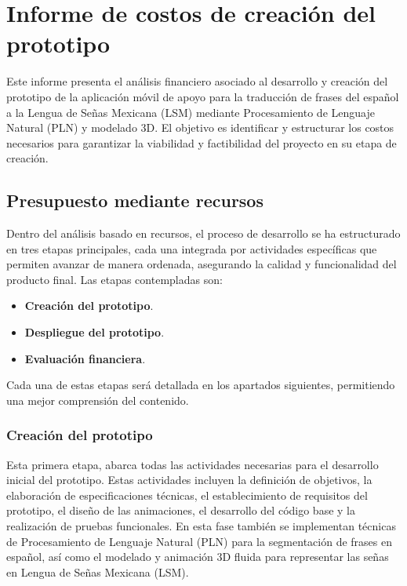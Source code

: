 \section{Informe de costos de creación del prototipo}
Este informe presenta el análisis financiero asociado al desarrollo y creación del prototipo de la aplicación móvil de apoyo para la traducción de frases del español a la Lengua de Señas Mexicana (LSM) mediante Procesamiento de Lenguaje Natural (PLN) y modelado 3D. El objetivo es identificar y estructurar los costos necesarios para garantizar la viabilidad y factibilidad del proyecto en su etapa de creación.

\subsection{Presupuesto mediante recursos}

Dentro del análisis basado en recursos, el proceso de desarrollo se ha estructurado en tres etapas principales, cada una integrada por actividades específicas que permiten avanzar de manera ordenada, asegurando la calidad y funcionalidad del producto final. Las etapas contempladas son:

\begin{itemize}
	\item \textbf{Creación del prototipo}. 
	\item \textbf{Despliegue del prototipo}.
	\item \textbf{Evaluación financiera}. 
\end{itemize}

Cada una de estas etapas será detallada en los apartados siguientes, permitiendo una mejor comprensión del contenido.

\subsubsection{Creación del prototipo}

Esta primera etapa, abarca todas las actividades necesarias para el desarrollo inicial del prototipo. Estas actividades incluyen la definición de objetivos, la elaboración de especificaciones técnicas, el establecimiento de requisitos del prototipo, el diseño de las animaciones, el desarrollo del código base y la realización de pruebas funcionales. En esta fase también se implementan técnicas de Procesamiento de Lenguaje Natural (PLN) para la segmentación de frases en español, así como el modelado y animación 3D fluida para representar las señas en Lengua de Señas Mexicana (LSM).

